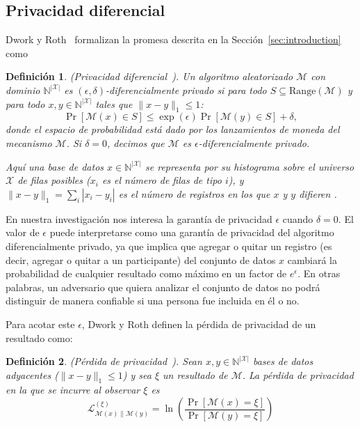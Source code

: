 \documentclass{ieeeaccess}
\newtheorem{definition}{Definición}[section]
\begin{document}
\subsection{Privacidad diferencial}

Dwork y Roth~\cite{dwork2014algorithmic} formalizan la promesa descrita en la Sección~\ref{sec:introduction} como

\begin{definition}
    (Privacidad diferencial~\cite[Def.~2.4]{dwork2014algorithmic}). Un algoritmo aleatorizado $\mathcal{M}$ con dominio $\mathbb{N}^{|\mathcal{X}|}$ es $(\epsilon, \delta)$-diferencialmente privado si para todo $S \subseteq \mathrm{Range}(\mathcal{M})$ y para todo $x, y \in \mathbb{N}^{|\mathcal{X}|}$ tales que $\|x - y\|_1 \leq 1$:
    \[
      \Pr[\mathcal{M}(x) \in S] \leq \exp(\epsilon) \Pr[\mathcal{M}(y) \in S] + \delta,
    \]
    donde el espacio de probabilidad está dado por los lanzamientos de moneda del mecanismo $\mathcal{M}$. Si $\delta = 0$, decimos que $\mathcal{M}$ es $\epsilon$-diferencialmente privado.

    Aquí una base de datos $x \in \mathbb{N}^{|\mathcal{X}|}$ se representa por su histograma sobre el universo $\mathcal{X}$ de filas posibles ($x_i$ es el número de filas de tipo $i$), y $\|x - y\|_1 = \sum_{i} |x_i - y_i|$ es el número de registros en los que $x$ y $y$ difieren \cite[Def.~2.3]{dwork2014algorithmic}.
    \label{def:dp}
\end{definition}

En nuestra investigación nos interesa la garantía de privacidad $\epsilon$ cuando $\delta = 0$. El valor de $\epsilon$ puede interpretarse como una garantía de privacidad del algoritmo diferencialmente privado, ya que implica que agregar o quitar un registro (es decir, agregar o quitar a un participante) del conjunto de datos $x$ cambiará la probabilidad de cualquier resultado como máximo en un factor de $e^{\epsilon}$. En otras palabras, un adversario que quiera analizar el conjunto de datos no podrá distinguir de manera confiable si una persona fue incluida en él o no.

Para acotar este $\epsilon$, Dwork y Roth definen la pérdida de privacidad de un resultado como:

\begin{definition}
    (Pérdida de privacidad~\cite[Sec.~2.3]{dwork2014algorithmic}). Sean $x, y \in \mathbb{N}^{|\mathcal{X}|}$ bases de datos adyacentes ($\|x - y\|_1 \leq 1$) y sea $\xi$ un resultado de $\mathcal{M}$. La pérdida de privacidad en la que se incurre al observar $\xi$ es
    \[
      \mathcal{L}^{(\xi)}_{\mathcal{M}(x) \| \mathcal{M}(y)} = \ln\left(\frac{\Pr[\mathcal{M}(x) = \xi]}{\Pr[\mathcal{M}(y) = \xi]}\right)
    \]
    \label{def:privacy_loss}
\end{definition}
\end{document}
